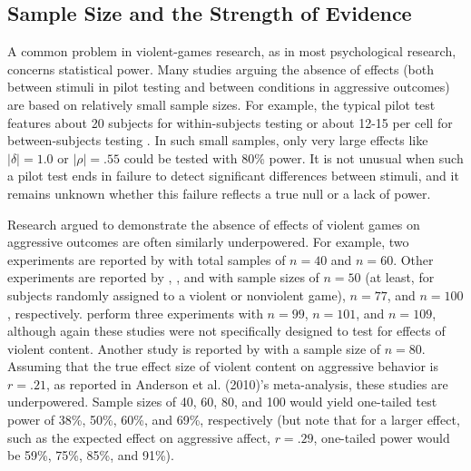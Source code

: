 \documentclass[man]{apa6}
\begin{document}
\subsection{Sample Size and the Strength of Evidence}
A common problem in violent-games research, as in most psychological research, concerns statistical power. Many studies arguing the absence of effects (both between stimuli in pilot testing and between conditions in aggressive outcomes) are based on relatively small sample sizes.   For example, the typical pilot test features about 20 subjects for within-subjects testing \citep[e.g.,][]{Arriaga:etal:2008} or about 12-15 per cell for between-subjects testing \citep[e.g.,][]{Anderson:etal:2004,Valadez:Ferguson:2012}. In such small samples, only very large effects like $|\delta| = 1.0$ or $|\rho| = .55$ could be tested with 80\% power. It is not unusual when such a pilot test ends in failure to detect significant differences between stimuli, and it remains unknown whether this failure reflects a true null or a lack of power.

Research argued to demonstrate the absence of effects of violent games on aggressive outcomes are often similarly underpowered. For example, two experiments are reported by \citet{Adachi:Willoughby:2011} with total samples of $n = 40$ and $n = 60$. Other experiments are reported by \citet{Ferguson:etal:2008}, \citet{Ferguson:Rueda:2010}, and \citet{Valadez:Ferguson:2012} with sample sizes of $n = 50$ (at least, for subjects randomly assigned to a violent or nonviolent game), $n = 77$, and $n = 100$, respectively. \citet[Studies 1, 2, and 5]{Przybylski:etal:2014} perform three experiments with $n = 99$, $n = 101$, and $n = 109$, although again these studies were not specifically designed to test for effects of violent content. Another study is reported by \citet{Elson:etal:2013} with a sample size of $ n = 80 $. Assuming that the true effect size of violent content on aggressive behavior is $r = .21$, as reported in Anderson et al. (2010)'s meta-analysis, these studies are underpowered. Sample sizes of 40, 60, 80, and 100 would yield one-tailed test power of 38\%, 50\%, 60\%, and 69\%, respectively (but note that for a larger effect, such as the expected effect on aggressive affect, $r = .29$, one-tailed power would be 59\%, 75\%, 85\%, and 91\%). 
\end{document}
